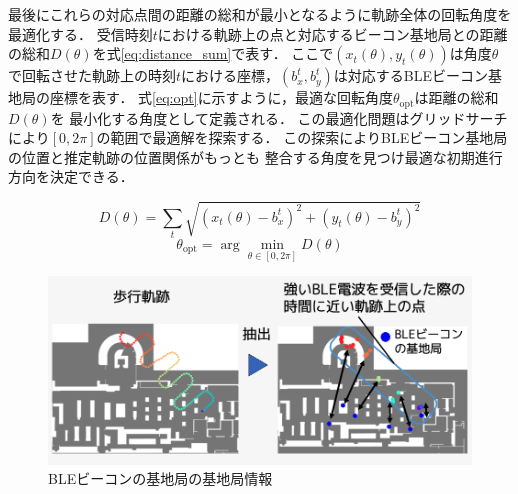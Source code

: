 最後にこれらの対応点間の距離の総和が最小となるように軌跡全体の回転角度を最適化する．
受信時刻$t$における軌跡上の点と対応するビーコン基地局との距離の総和$D(\theta)$を式\ref{eq:distance_sum}で表す．
ここで$(x_t(\theta), y_t(\theta))$は角度$\theta$で回転させた軌跡上の時刻$t$における座標，$(b_x^t, b_y^t)$は対応するBLEビーコン基地局の座標を表す．
式\ref{eq:opt}に示すように，最適な回転角度$\theta_{\mathrm{opt}}$は距離の総和$D(\theta)$を
最小化する角度として定義される．
この最適化問題はグリッドサーチにより$[0, 2\pi]$の範囲で最適解を探索する．%
この探索によりBLEビーコン基地局の位置と推定軌跡の位置関係がもっとも
整合する角度を見つけ最適な初期進行方向を決定できる．

\begin{equation}
\label{eq:distance_sum}
D(\theta) = \sum_{t} \sqrt{(x_t(\theta) - b_x^t)^2 + (y_t(\theta) - b_y^t)^2}
\end{equation}
\begin{equation}
\label{eq:opt}
\theta_{\mathrm{opt}} = \arg\min_{\theta \in [0, 2\pi]} D(\theta)
\end{equation}

\begin{figure}[H]
	\centering
	\includegraphics[width=\linewidth]{../image/ble-merge.jpg}
	\caption{BLEビーコンの基地局の基地局情報}    \label{fig:ble-merge}
\end{figure}







